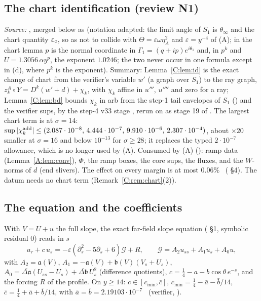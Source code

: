 \documentclass[11pt]{article}
\begin{document}
\subsection{The chart identification (review N1)}\label{A:sec:chart}
\noindent\emph{Source:} , merged below as  (notation adapted: the limit angle of $S_1$ is $\theta_\infty$ and the chart quantity $\varepsilon_{\rm c}$, so as not to collide with $\Theta=\varepsilon\omega\eta_A^2$ and $\varepsilon=y^{-4}$ of (A); in the chart lemma $p$ is the normal coordinate in $\Gamma_1=(q+ip)e^{i\theta_1}$ and, in $p^k$ and $U=1.3056\,\alpha y^p$, the exponent $1.0246$; the two never occur in one formula except in (d), where $p^k$ is the exponent). Summary: Lemma~\ref{C:lem:id} is the exact change of chart from the verifier's variable $w'$ (a graph over $S_1$) to the ray graph, $z^A_k\circ Y=D^k(w'+d)+\chi_k$, with $\chi_k$ affine in $u'''$, $u''''$ and zero for a ray; Lemma~\ref{C:lem:bd} bounds $\chi_k$ in arb from the step-1 tail envelopes of $S_1$ () and the verifier sups, by the step-4 v33 stage , rerun on  as stage 19 of  \tC. The largest chart term is at $\sigma=14$: $\sup|\chi^{\rm add}_k|\le(2.087\cdot10^{-8},\,4.444\cdot10^{-7},\,9.910\cdot10^{-6},\,2.307\cdot10^{-4})$, about $\times20$ smaller at $\sigma=16$ and below $10^{-13}$ for $\sigma\ge28$; it replaces the typed $2\cdot10^{-7}$ allowance, which is no longer used by (A). Consumed by (A) (): ramp data (Lemma~\ref{A:lem:conv}), $\Phi$, the ramp boxes, the core sups, the fluxes, and the $W$-norms of $d$ (end slivers). The effect on every margin is at most $0.06\%$ \tC\ ( \S4). The datum needs no chart term (Remark~\ref{C:rem:chart}(2)).


\subsection{The equation and the coefficients}\label{A:sec:eq}
With $V=U+u$ the full slope, the exact far-field slope equation ( \S1, symbolic residual $0$) reads in $s$
\begin{equation}\label{A:eq:u}
u_\tau+c\,u_s=-\varepsilon(\partial_s^2-5\partial_s+6)\mathcal G+R,\qquad \mathcal G=A_2u_{ss}+A_1u_s+A_0u ,
\end{equation}
with $A_2=\mathfrak a(V)$, $A_1=-\mathfrak a(V)+\mathfrak b(V)(V_s+U_s)$, $A_0=\overline{\Delta\mathfrak a}(U_{ss}-U_s)+\overline{\Delta\mathfrak b}\,U_s^2$ (difference quotients), $c=\frac14-a-b\cos\theta\,e^{-s}$, and the forcing $R$ of the profile. On $y\ge14$: $c\in[c_{\min},\bar c]$, $c_{\min}=\frac14-\bar a-\bar b/14$, $\bar c=\frac14+\bar a+\bar b/14$, with $\bar a=\bar b=2.19103\cdot10^{-7}$ \tH\ (verifier, ).
\end{document}
